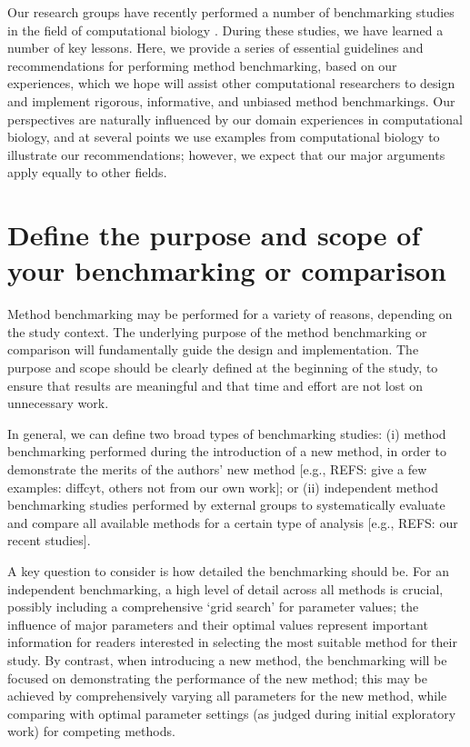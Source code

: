 \documentclass[12pt, a4paper]{article}
\begin{document}
Our research groups have recently performed a number of benchmarking studies in the field of computational biology \citep{Saelens2018b, Soneson2018, Saelens2018a, Weber2016}. During these studies, we have learned a number of key lessons. Here, we provide a series of essential guidelines and recommendations for performing method benchmarking, based on our experiences, which we hope will assist other computational researchers to design and implement rigorous, informative, and unbiased method benchmarkings. Our perspectives are naturally influenced by our domain experiences in computational biology, and at several points we use examples from computational biology to illustrate our recommendations; however, we expect that our major arguments apply equally to other fields.




\section{Define the purpose and scope of your benchmarking or comparison}

Method benchmarking may be performed for a variety of reasons, depending on the study context. The underlying purpose of the method benchmarking or comparison will fundamentally guide the design and implementation. The purpose and scope should be clearly defined at the beginning of the study, to ensure that results are meaningful and that time and effort are not lost on unnecessary work.

In general, we can define two broad types of benchmarking studies: (i) method benchmarking performed during the introduction of a new method, in order to demonstrate the merits of the authors' new method [e.g., REFS: give a few examples: diffcyt, others not from our own work]; or (ii) independent method benchmarking studies performed by external groups to systematically evaluate and compare all available methods for a certain type of analysis [e.g., REFS: our recent studies].

A key question to consider is how detailed the benchmarking should be. For an independent benchmarking, a high level of detail across all methods is crucial, possibly including a comprehensive `grid search' for parameter values; the influence of major parameters and their optimal values represent important information for readers interested in selecting the most suitable method for their study. By contrast, when introducing a new method, the benchmarking will be focused on demonstrating the performance of the new method; this may be achieved by comprehensively varying all parameters for the new method, while comparing with optimal parameter settings (as judged during initial exploratory work) for competing methods.
\end{document}
